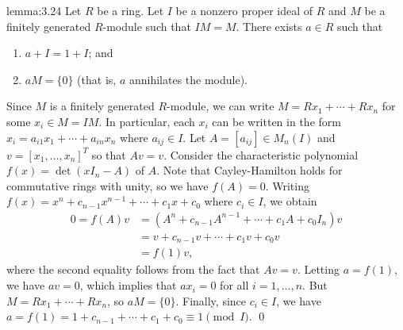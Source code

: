 \begin{lemma}[Nakayama]{lemma:3.24}
    Let $R$ be a ring. Let $I$ be a nonzero proper ideal of $R$ and $M$ 
    be a finitely generated $R$-module such that $IM = M$. There exists 
    $a \in R$ such that 
    \begin{enumerate}[(1)]
        \item $a + I = 1 + I$; and 
        \item $aM = \{0\}$ (that is, $a$ annihilates the module).
    \end{enumerate}
\end{lemma}\vspace{-0.25cm}
\begin{pf}
    Since $M$ is a finitely generated $R$-module, we can write 
    $M = Rx_1 + \cdots + Rx_n$ for some $x_i \in M = IM$. In particular, 
    each $x_i$ can be written in the form 
    $x_i = a_{i1} x_1 + \cdots + a_{in} x_n$
    where $a_{ij} \in I$. Let $A = [a_{ij}] \in M_n(I)$ and 
    $v = [x_1, \dots, x_n]^T$ so that $Av = v$. Consider the characteristic 
    polynomial $f(x) = \det(xI_n - A)$ of $A$.
    Note that Cayley-Hamilton holds for commutative rings with unity, so we have
    $f(A) = 0$. Writing $f(x) = x^n + c_{n-1} x^{n-1} + \cdots + c_1 x + c_0$ 
    where $c_i \in I$, we obtain 
    \begin{align*}
        0 = f(A)v &= (A^n + c_{n-1} A^{n-1} + \cdots + c_1 A + c_0 I_n) v \\ 
        &= v + c_{n-1}v + \cdots + c_1 v + c_0 v \\ 
        &= f(1) v,
    \end{align*}
    where the second equality follows from the fact that $Av = v$. 
    Letting $a = f(1)$, we have $av = 0$, which implies that 
    $ax_i = 0$ for all $i = 1, \dots, n$. But $M = Rx_1 + \cdots + Rx_n$,
    so $aM = \{0\}$. Finally, since $c_i \in I$, we have 
    $a = f(1) = 1 + c_{n-1} + \cdots + c_1 + c_0 \equiv 1 \pmod I$. \qed 
\end{pf}\vspace{-0.15cm}

